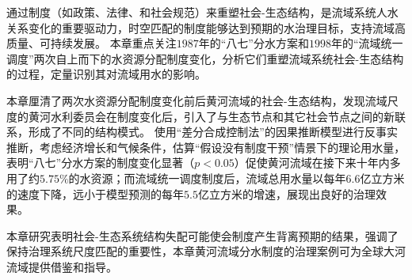 通过制度（如政策、法律、和社会规范）来重塑社会-生态结构，是流域系统人水关系变化的重要驱动力，时空匹配的制度能够达到预期的水治理目标，支持流域高质量、可持续发展。
本章重点关注$1987$年的“八七”分水方案和$1998$年的“流域统一调度”两次自上而下的水资源分配制度变化，分析它们重塑流域系统社会-生态结构的过程，定量识别其对流域用水的影响。

本章厘清了两次水资源分配制度变化前后黄河流域的社会-生态结构，发现流域尺度的黄河水利委员会在制度变化后，引入了与生态节点和其它社会节点之间的新联系，形成了不同的结构模式。
使用“差分合成控制法”的因果推断模型进行反事实推断，考虑经济增长和气候条件，估算“假设没有制度干预”情景下的理论用水量，表明“八七”分水方案的制度变化显著（$p<0.05$）促使黄河流域在接下来十年内多用了约$5.75\%$的水资源；而流域统一调度制度后，流域总用水量以每年$6.6$亿立方米的速度下降，远小于模型预测的每年$5.5$亿立方米的增速，展现出良好的治理效果。

本章研究表明社会-生态系统结构失配可能使会制度产生背离预期的结果，强调了保持治理系统尺度匹配的重要性，本章黄河流域分水制度的治理案例可为全球大河流域提供借鉴和指导。
